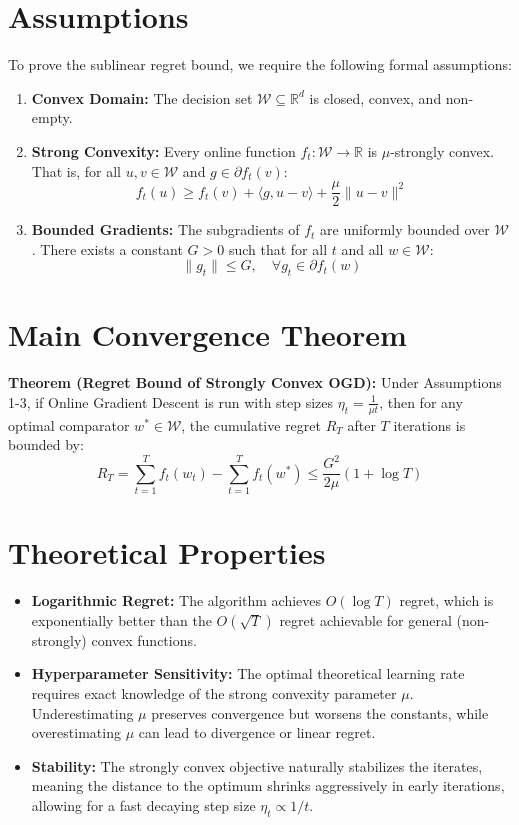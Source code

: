 \documentclass[12pt]{article}
\begin{document}
\section*{Assumptions}
To prove the sublinear regret bound, we require the following formal assumptions:
\begin{enumerate}
    \item \textbf{Convex Domain:} The decision set $\mathcal{W} \subseteq \mathbb{R}^d$ is closed, convex, and non-empty.
    \item \textbf{Strong Convexity:} Every online function $f_t: \mathcal{W} \to \mathbb{R}$ is $\mu$-strongly convex. That is, for all $u, v \in \mathcal{W}$ and $g \in \partial f_t(v)$:
    $$f_t(u) \geq f_t(v) + \langle g, u - v \rangle + \frac{\mu}{2} \|u - v\|^2$$
    \item \textbf{Bounded Gradients:} The subgradients of $f_t$ are uniformly bounded over $\mathcal{W}$. There exists a constant $G > 0$ such that for all $t$ and all $w \in \mathcal{W}$:
    $$\|g_t\| \leq G, \quad \forall g_t \in \partial f_t(w)$$
\end{enumerate}

\section*{Main Convergence Theorem}
\textbf{Theorem (Regret Bound of Strongly Convex OGD):} Under Assumptions 1-3, if Online Gradient Descent is run with step sizes $\eta_t = \frac{1}{\mu t}$, then for any optimal comparator $w^* \in \mathcal{W}$, the cumulative regret $R_T$ after $T$ iterations is bounded by:
$$R_T = \sum_{t=1}^T f_t(w_t) - \sum_{t=1}^T f_t(w^*) \leq \frac{G^2}{2\mu} (1 + \log T)$$

\section*{Theoretical Properties}
\begin{itemize}
    \item \textbf{Logarithmic Regret:} The algorithm achieves $O(\log T)$ regret, which is exponentially better than the $O(\sqrt{T})$ regret achievable for general (non-strongly) convex functions. 
    \item \textbf{Hyperparameter Sensitivity:} The optimal theoretical learning rate requires exact knowledge of the strong convexity parameter $\mu$. Underestimating $\mu$ preserves convergence but worsens the constants, while overestimating $\mu$ can lead to divergence or linear regret.
    \item \textbf{Stability:} The strongly convex objective naturally stabilizes the iterates, meaning the distance to the optimum shrinks aggressively in early iterations, allowing for a fast decaying step size $\eta_t \propto 1/t$.
\end{itemize}
\end{document}
